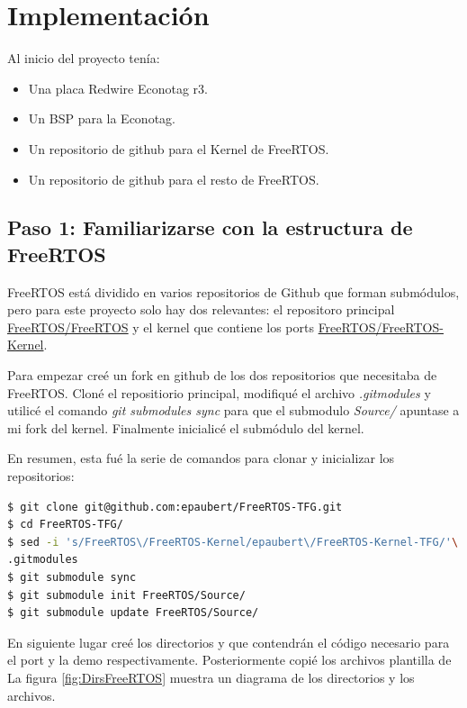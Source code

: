 \chapter{Implementación}


Al inicio del proyecto tenía:
\begin{itemize}
    \item Una placa Redwire Econotag r3.
    \item Un BSP para la Econotag.
    \item Un repositorio de github para el Kernel de FreeRTOS.
    \item Un repositorio de github para el resto de FreeRTOS.
\end{itemize}

\section{Paso 1: Familiarizarse con la estructura de FreeRTOS}
FreeRTOS está dividido en varios repositorios de Github que forman submódulos, pero para este proyecto solo hay dos relevantes: el repositoro principal \href{https://github.com/FreeRTOS/FreeRTOS}{FreeRTOS/FreeRTOS} y el kernel que contiene los ports \href{https://github.com/FreeRTOS/FreeRTOS-Kernel}{FreeRTOS/FreeRTOS-Kernel}.

Para empezar creé un fork en github de los dos repositorios que necesitaba de FreeRTOS. Cloné el repositiorio principal, modifiqué el archivo \textit{.gitmodules} y utilicé el comando \textit{git submodules sync} para que el submodulo \textit{Source/} apuntase a mi fork del kernel. Finalmente inicialicé el submódulo del kernel.

En resumen, esta fué la serie de comandos para clonar y inicializar los repositorios:
\begin{lstlisting}[language=bash]
$ git clone git@github.com:epaubert/FreeRTOS-TFG.git
$ cd FreeRTOS-TFG/
$ sed -i 's/FreeRTOS\/FreeRTOS-Kernel/epaubert\/FreeRTOS-Kernel-TFG/'\
.gitmodules
$ git submodule sync
$ git submodule init FreeRTOS/Source/
$ git submodule update FreeRTOS/Source/
\end{lstlisting}

En siguiente lugar creé los directorios  y  que contendrán el código necesario para el port y la demo respectivamente. Posteriormente copié los archivos plantilla de
La figura \ref{fig:DirsFreeRTOS} muestra un diagrama de los directorios y los archivos.

